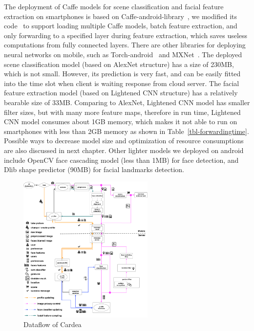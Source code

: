 The deployment of Caffe models for scene classification and facial feature extraction on smartphones is based on Caffe-android-library~\cite{links:caffeandroidlib}, we modified its code~\cite{links:caffeandroidlibzr} to support loading multiple Caffe models, batch feature extraction, and only forwarding to a specified layer during feature extraction, which saves useless computations from fully connected layers. There are other libraries for deploying neural networks on mobile, such as Torch-android~\cite{links:torchandroid} and MXNet~\cite{links:mxnetmobile}. The deployed scene classification model (based on AlexNet structure) has a size of 230MB, which is not small. However, its prediction is very fast, and can be easily fitted into the time slot when client is waiting response from cloud server. The facial feature extraction model (based on Lightened CNN structure) has a relatively bearable size of 33MB. Comparing to AlexNet, Lightened CNN model has smaller filter sizes, but with many more feature maps, therefore in run time, Lightened CNN model consumes about 1GB memory, which makes it not able to run on smartphones with less than 2GB memory as shown in Table~\ref{tbl-forwardingtime}. Possible ways to decrease model size and optimization of resource consumptions are also discussed in next chapter. Other lighter models we deployed on android include OpenCV face cascading model (less than 1MB) for face detection, and Dlib shape predictor (90MB) for facial landmarks detection.


\begin{figure}[b!]
    \centering
    \includegraphics[width=0.6\textwidth]{figure/ch4-cardeadataflow.pdf}
    \caption{Dataflow of Cardea}
    \label{fig:ch4-cardeadataflow}
\end{figure}

